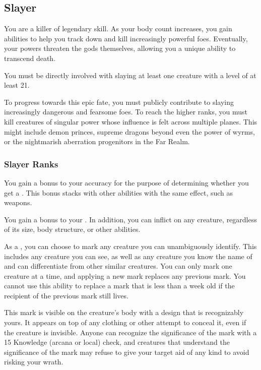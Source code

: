     \subsection{Slayer}
        You are a killer of legendary skill.
        As your body count increases, you gain abilities to help you track down and kill increasingly powerful foes.
        Eventually, your powers threaten the gods themselves, allowing you a unique ability to transcend death.

         You must be directly involved with slaying at least one  creature with a level of at least 21.

         To progress towards this epic fate, you must publicly contribute to slaying increasingly dangerous and fearsome foes.
        To reach the higher ranks, you must kill creatures of singular power whose influence is felt across multiple planes.
        This might include demon princes, supreme dragons beyond even the power of wyrms, or the nightmarish aberration progenitors in the Far Realm.

        \subsubsection{Slayer Ranks}
             You gain a  bonus to your accuracy for the purpose of determining whether you get a .
            This bonus stacks with other abilities with the same effect, such as  weapons.

             You gain a  bonus to your .
            In addition, you can inflict  on any creature, regardless of its size, body structure, or other abilities.

             As a , you can choose to mark any creature you can unambiguously identify.
            This includes any creature you can see, as well as any creature you know the name of and can differentiate from other similar creatures.
            You can only mark one creature at a time, and applying a new mark replaces any previous mark.
            You cannot use this ability to replace a mark that is less than a week old if the recipient of the previous mark still lives.

            This mark is visible on the creature's body with a design that is recognizably yours.
            It appears on top of any clothing or other attempt to conceal it, even if the creature is invisible.
            Anyone can recognize the significance of the mark with a  15 Knowledge (arcana or local) check, and creatures that understand the significance of the mark may refuse to give your target aid of any kind to avoid risking your wrath.


